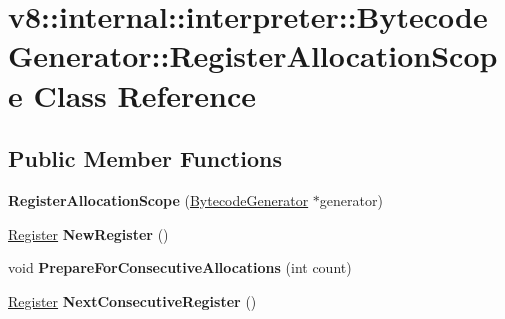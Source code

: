 \hypertarget{classv8_1_1internal_1_1interpreter_1_1_bytecode_generator_1_1_register_allocation_scope}{}\section{v8\+:\+:internal\+:\+:interpreter\+:\+:Bytecode\+Generator\+:\+:Register\+Allocation\+Scope Class Reference}
\label{classv8_1_1internal_1_1interpreter_1_1_bytecode_generator_1_1_register_allocation_scope}
\subsection*{Public Member Functions}
\begin{DoxyCompactItemize}
\item 
{\bfseries Register\+Allocation\+Scope} (\hyperlink{classv8_1_1internal_1_1interpreter_1_1_bytecode_generator}{Bytecode\+Generator} $\ast$generator)\hypertarget{classv8_1_1internal_1_1interpreter_1_1_bytecode_generator_1_1_register_allocation_scope_ab1c62c9328b5013d6b4e4bcc0d06815d}{}\label{classv8_1_1internal_1_1interpreter_1_1_bytecode_generator_1_1_register_allocation_scope_ab1c62c9328b5013d6b4e4bcc0d06815d}

\item 
\hyperlink{classv8_1_1internal_1_1interpreter_1_1_register}{Register} {\bfseries New\+Register} ()\hypertarget{classv8_1_1internal_1_1interpreter_1_1_bytecode_generator_1_1_register_allocation_scope_a518cf20ce959059d363ed7b15a0d5a30}{}\label{classv8_1_1internal_1_1interpreter_1_1_bytecode_generator_1_1_register_allocation_scope_a518cf20ce959059d363ed7b15a0d5a30}

\item 
void {\bfseries Prepare\+For\+Consecutive\+Allocations} (int count)\hypertarget{classv8_1_1internal_1_1interpreter_1_1_bytecode_generator_1_1_register_allocation_scope_a3a32ceda96c47b88f7cb1e120ba33cd7}{}\label{classv8_1_1internal_1_1interpreter_1_1_bytecode_generator_1_1_register_allocation_scope_a3a32ceda96c47b88f7cb1e120ba33cd7}

\item 
\hyperlink{classv8_1_1internal_1_1interpreter_1_1_register}{Register} {\bfseries Next\+Consecutive\+Register} ()\hypertarget{classv8_1_1internal_1_1interpreter_1_1_bytecode_generator_1_1_register_allocation_scope_a5b50366f5567ea06f7b341bf66d8ce3d}{}\label{classv8_1_1internal_1_1interpreter_1_1_bytecode_generator_1_1_register_allocation_scope_a5b50366f5567ea06f7b341bf66d8ce3d}


\end{DoxyCompactItemize}
